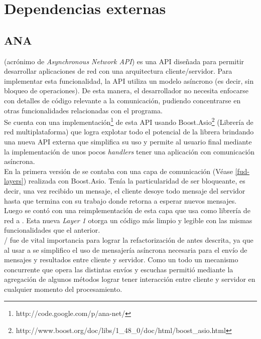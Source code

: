 \chapter{Dependencias externas}

\section{ANA}
\ana{} (acrónimo de \textit{Asynchronous  Network API}) es una API diseñada para permitir desarrollar
aplicaciones de red con una arquitectura cliente/servidor.
Para implementar esta funcionalidad, la API utiliza un modelo asíncrono (es decir, sin bloqueo de operaciones). De esta
manera, el desarrollador no necesita enfocarse con detalles de código relevante a la comunicación, pudiendo
concentrarse en otras funcionalidades relacionadas con el programa.\\

Se cuenta con una implementación\footnote{http://code.google.com/p/ana-net/} de esta API usando
Boost.Asio\footnote{http://www.boost.org/doc/libs/1\_48\_0/doc/html/boost\_asio.html} (Librería de red multiplataforma)
que logra explotar todo el potencial de la librera brindando una nueva API externa que simplifica su uso y permite al
usuario final mediante la implementación de unos pocos \textit{handlers} tener una aplicación con comunicación
asíncrona.\\


En la primera versión de \fud{} se contaba con una capa de comunicación (Véase \ref{fud-layers}) realizada con
Boost.Asio. Tenía la particularidad de ser bloqueante, es decir, una vez recibido un mensaje, el cliente desoye todo
mensaje del servidor hasta que termina con su trabajo donde retorna a esperar nuevos mensajes. Luego se contó con una
reimplementación de esta capa que usa como librería de red a \ana. Esta nueva \textit{Layer 1} otorga un código más
limpio y
legible con las mismas funcionalidades que el anterior.\\

\fud/\ana{} fue de vital importancia para lograr la refactorización de \fud{} antes descrita, ya que al usar a \ana{}
se simplifico el uso de mensajería asíncrona necesaria para el envío de mensajes y resultados entre cliente y
servidor. Como un todo un mecanismo concurrente que opera las distintas envíos y escuchas permitió mediante
la agregación de algunos métodos lograr tener interacción entre cliente y servidor en cualquier momento del
procesamiento.

